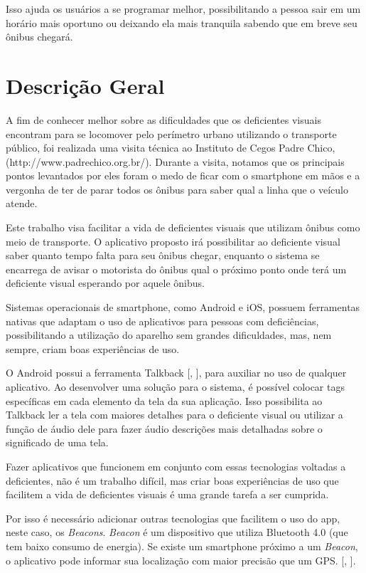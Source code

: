 \documentclass[
	12pt,				%
	oneside,			%
	a4paper,			%
	brazil				%
]{abntex2}
\newcommand{\citecustom}[1]{[\citeauthoronline{#1}, \citeyear{#1}]}
\begin{document}
Isso ajuda os usuários a se programar melhor, possibilitando a pessoa sair em um horário mais oportuno ou deixando ela mais tranquila sabendo que em breve seu ônibus chegará.

\section{Descrição Geral}

A fim de conhecer melhor sobre as dificuldades que os deficientes visuais encontram para se locomover pelo perímetro urbano utilizando o transporte público, foi realizada uma visita técnica ao Instituto de Cegos Padre Chico, (http://www.padrechico.org.br/). Durante a visita, notamos que os principais pontos levantados por eles foram o medo de ficar com o smartphone em mãos e a vergonha de ter de parar todos os ônibus para saber qual a linha que o veículo atende.

Este trabalho visa facilitar a vida de deficientes visuais que utilizam ônibus como meio de transporte. O aplicativo proposto irá possibilitar ao deficiente visual saber quanto tempo falta para seu ônibus chegar, enquanto o sistema se encarrega de avisar o motorista do ônibus qual o próximo ponto onde terá um deficiente visual esperando por aquele ônibus.

Sistemas operacionais de smartphone, como Android e iOS, possuem ferramentas nativas que adaptam o uso de aplicativos para pessoas com deficiências, possibilitando a utilização do aparelho sem grandes dificuldades, mas, nem sempre, criam boas experiências de uso. 

O Android possui a ferramenta Talkback \citecustom{talkback}, para auxiliar no uso de qualquer aplicativo. Ao desenvolver uma solução para o sistema, é possível colocar tags específicas em cada elemento da tela da sua aplicação. Isso possibilita ao Talkback ler a tela com maiores detalhes para o deficiente visual ou utilizar a função de áudio dele para fazer áudio descrições mais detalhadas sobre o significado de uma tela.

Fazer aplicativos que funcionem em conjunto com essas tecnologias voltadas a deficientes, não é um trabalho difícil, mas criar boas experiências de uso que facilitem a vida de deficientes visuais é uma grande tarefa a ser cumprida.

Por isso é necessário adicionar outras tecnologias que facilitem o uso do app, neste caso, os \textit{Beacons}. \textit{Beacon} é um dispositivo que utiliza Bluetooth 4.0 (que tem baixo consumo de energia). Se existe um smartphone próximo a um \textit{Beacon}, o aplicativo pode informar sua localização com maior precisão que um GPS. \citecustom{beacon}.
\end{document}
